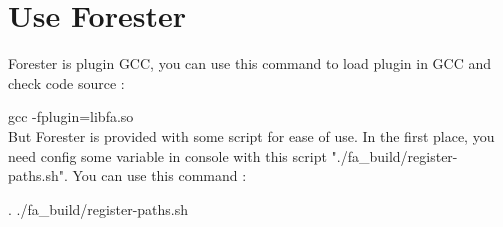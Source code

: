 \section {Use Forester}

Forester is plugin GCC, you can use this command to load plugin in GCC and check code source :

gcc -fplugin=libfa.so
\\

But Forester is provided with some script for ease of use. In the first place, you need config some variable in console with this script "./fa\_build/register-paths.sh". You can use this command :

. ./fa\_build/register-paths.sh
\\

